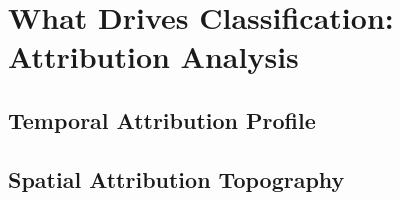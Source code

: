 \section{What Drives Classification: Attribution Analysis}
\label{sec:results_attribution}



\subsection{Temporal Attribution Profile}
\label{subsec:results_temporal_attribution}

%
%
%
%
%
%
%


\subsection{Spatial Attribution Topography}
\label{subsec:results_spatial_attribution}

%
%
%
%
%
%
%
%


